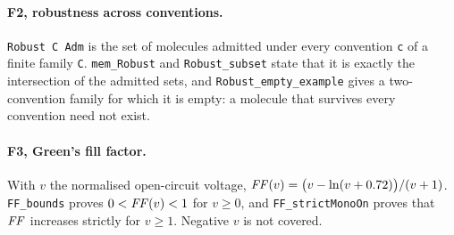 \documentclass[11pt]{article}
\begin{document}
\paragraph{F2, robustness across conventions.} \texttt{Robust C Adm} is the set of molecules admitted under every
convention \texttt{c} of a finite family \texttt{C}. \texttt{mem\_Robust} and \texttt{Robust\_subset} state that it is
exactly the intersection of the admitted sets, and \texttt{Robust\_empty\_example} gives a two-convention family for
which it is empty: a molecule that survives every convention need not exist.

\paragraph{F3, Green's fill factor.} With $v$ the normalised open-circuit voltage,
$\mathit{FF}(v) = \bigl(v - \ln(v + 0.72)\bigr)/(v + 1)$. \texttt{FF\_bounds} proves $0 < \mathit{FF}(v) < 1$ for $v \ge 0$, and
\texttt{FF\_strictMonoOn} proves that $\mathit{FF}$ increases strictly for $v \ge 1$. Negative $v$ is not covered.
\end{document}
